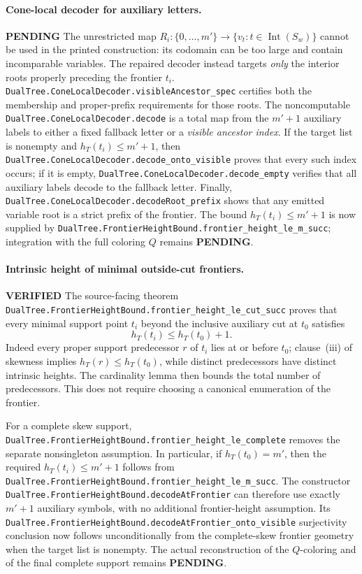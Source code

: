 \documentclass[11pt]{article}
\newcommand{\ok}{\textcolor{green!40!black}{\textbf{VERIFIED}}}
\newcommand{\todo}{\textcolor{gray!70!black}{\textbf{PENDING}}}
\newcommand{\lean}[1]{\texttt{#1}}
\begin{document}
\paragraph{Cone-local decoder for auxiliary letters.} \todo
The unrestricted map $R_i:\{0,\ldots,m'\}\to
\{v_t:t\in\operatorname{Int}(S_w)\}$ cannot be used in the
printed construction: its codomain can be too large and contain
incomparable variables.  The repaired decoder instead targets
\emph{only} the interior roots properly preceding the frontier $t_i$.
\lean{DualTree.ConeLocalDecoder.visibleAncestor_spec}
certifies both the membership and proper-prefix requirements for
those roots.  The noncomputable
\lean{DualTree.ConeLocalDecoder.decode} is a total map from the
$m'+1$ auxiliary labels to either a fixed fallback letter or a
\emph{visible ancestor index}.  If the target list is nonempty and
$h_T(t_i)\le m'+1$, then
\lean{DualTree.ConeLocalDecoder.decode_onto_visible}
proves that every such index occurs; if it is empty,
\lean{DualTree.ConeLocalDecoder.decode_empty} verifies that all
auxiliary labels decode to the fallback letter.  Finally,
\lean{DualTree.ConeLocalDecoder.decodeRoot_prefix} shows that
any emitted variable root is a strict prefix of the frontier.
The bound $h_T(t_i)\le m'+1$ is now supplied by
\lean{DualTree.FrontierHeightBound.frontier_height_le_m_succ};
integration with the full coloring $Q$ remains \todo.

\paragraph{Intrinsic height of minimal outside-cut frontiers.} \ok
The source-facing theorem
\lean{DualTree.FrontierHeightBound.frontier_height_le_cut_succ}
proves that every minimal support point $t_i$ beyond the inclusive
auxiliary cut at $t_0$ satisfies
\[
h_T(t_i)\le h_T(t_0)+1.
\]
Indeed every proper support predecessor $r$ of $t_i$ lies at or before
$t_0$; clause~(iii) of skewness implies
$h_T(r)\le h_T(t_0)$, while distinct predecessors have distinct
intrinsic heights.  The cardinality lemma then bounds the total number
of predecessors.  This does not require choosing a canonical
enumeration of the frontier.

For a complete skew support,
\lean{DualTree.FrontierHeightBound.frontier_height_le_complete}
removes the separate nonsingleton assumption.  In particular, if
$h_T(t_0)=m'$, then the required $h_T(t_i)\le m'+1$ follows from
\lean{DualTree.FrontierHeightBound.frontier_height_le_m_succ}.
The constructor
\lean{DualTree.FrontierHeightBound.decodeAtFrontier}
can therefore use exactly $m'+1$ auxiliary symbols, with no additional
frontier-height assumption.  Its
\lean{DualTree.FrontierHeightBound.decodeAtFrontier_onto_visible}
surjectivity conclusion now follows unconditionally from the
complete-skew frontier geometry when the target list is nonempty.
The actual reconstruction of the $Q$-coloring and of the final
complete support remains \todo.
\end{document}
